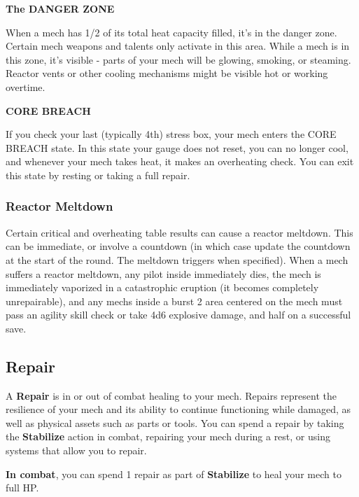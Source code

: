 \begin{center}
  \textbf{The DANGER ZONE}
\end{center}

When a mech has 1/2 of its total heat capacity filled, it’s in the danger zone. Certain mech weapons and talents only activate in this area. While a mech is in this zone, it’s visible - parts of your mech will be glowing, smoking, or steaming. Reactor vents or other cooling mechanisms might be visible hot or working overtime. 

\begin{center}
  \textbf{CORE BREACH}
\end{center}

If you check your last (typically 4th) stress box, your mech enters the CORE BREACH state. In this state your gauge does not reset, you can no longer cool, and whenever your mech takes heat, it makes an overheating check. You can exit this state by resting or taking a full repair.

\subsubsection{Reactor Meltdown}

Certain critical and overheating table results can cause a reactor meltdown. This can be immediate, or involve a countdown (in which case update the countdown at the start of the round. The meltdown triggers when specified). When a mech suffers a reactor meltdown, any pilot inside immediately dies, the mech is immediately vaporized in a catastrophic eruption (it becomes completely unrepairable), and any mechs inside a burst 2 area centered on the mech must pass an agility skill check or take 4d6 explosive damage, and half on a successful save. 

\subsection{Repair}

A \textbf{Repair} is in or out of combat healing to your mech. Repairs represent the resilience of your mech and its ability to continue functioning while damaged, as well as physical assets such as parts or tools. You can spend a repair by taking the \textbf{Stabilize} action in combat, repairing your mech during a rest, or using systems that allow you to repair. 

\textbf{In combat}, you can spend 1 repair as part of \textbf{Stabilize} to heal your mech to full HP.

